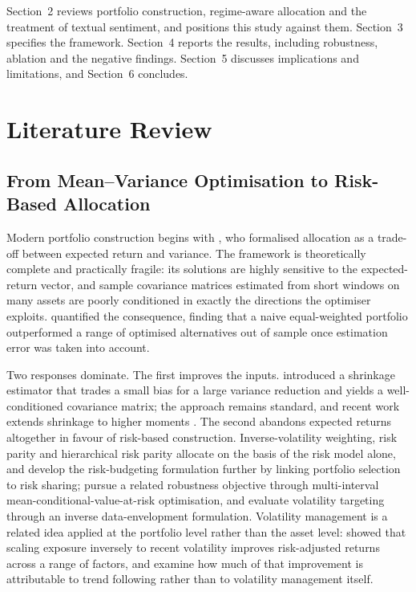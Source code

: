 \documentclass{singlecol-new}
\theoremstyle{TH}{
\newtheorem{lemma}{Lemma}
\newtheorem{theorem}[lemma]{Theorem}
\newtheorem{corrolary}[lemma]{Corrolary}
\newtheorem{conjecture}[lemma]{Conjecture}
\newtheorem{proposition}[lemma]{Proposition}
\newtheorem{claim}[lemma]{Claim}
\newtheorem{stheorem}[lemma]{Wrong Theorem}
\newtheorem{algorithm}{Algorithm}
}
\theoremstyle{THrm}{
\newtheorem{definition}{Definition}[section]
\newtheorem{question}{Question}[section]
\newtheorem{remark}{Remark}
\newtheorem{scheme}{Scheme}
}
\theoremstyle{THhit}{
\newtheorem{case}{Case}[section]
}
\begin{document}
Section~2 reviews portfolio construction, regime-aware allocation and the treatment of
textual sentiment, and positions this study against them. Section~3 specifies the
framework. Section~4 reports the results, including robustness, ablation and the
negative findings. Section~5 discusses implications and limitations, and Section~6
concludes.

\section{Literature Review}
\label{sec:lit}

\subsection{From Mean--Variance Optimisation to Risk-Based Allocation}

Modern portfolio construction begins with \citet{markowitz52}, who formalised
allocation as a trade-off between expected return and variance. The framework is
theoretically complete and practically fragile: its solutions are highly sensitive to
the expected-return vector, and sample covariance matrices estimated from short windows
on many assets are poorly conditioned in exactly the directions the optimiser exploits.
\citet{demiguel09} quantified the consequence, finding that a naive equal-weighted
portfolio outperformed a range of optimised alternatives out of sample once estimation
error was taken into account.

Two responses dominate. The first improves the inputs. \citet{ledoit04} introduced a
shrinkage estimator that trades a small bias for a large variance reduction and yields
a well-conditioned covariance matrix; the approach remains standard, and recent work
extends shrinkage to higher moments \citep{lu25}. The second abandons expected returns
altogether in favour of risk-based construction. Inverse-volatility weighting, risk
parity and hierarchical risk parity \citep{prado16} allocate on the basis of the risk
model alone, and \citet{asimit25} develop the risk-budgeting formulation further by
linking portfolio selection to risk sharing; \citet{khodamoradi23} pursue a related
robustness objective through multi-interval mean-conditional-value-at-risk
optimisation, and \citet{kehinde25} evaluate volatility targeting through an inverse
data-envelopment formulation. Volatility management is a related idea
applied at the portfolio level rather than the asset level: \citet{moreira17} showed
that scaling exposure inversely to recent volatility improves risk-adjusted returns
across a range of factors, and \citet{hood25} examine how much of that improvement is
attributable to trend following rather than to volatility management itself.
\end{document}
